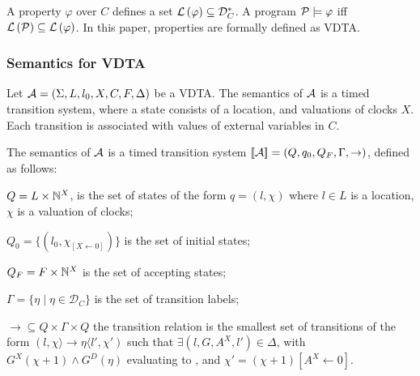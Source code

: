 A property $\varphi$ over $C$ defines a set ${\mathcal L}\left(\varphi\right)\subseteq {\mathcal D}_C^{*}$.
A program ${\mathcal P} \models \varphi$ iff ${\mathcal L}\left({\mathcal P}\right) \subseteq  {\mathcal L}\left(\varphi\right)$.
In this paper, properties are formally defined as VDTA.


\subsubsection{Semantics for \ac{VDTA}}

Let ${\mathcal A} = \left(\Sigma, L, {l_0}, X, C, F,  \Delta \right)$  be a VDTA.
The semantics of ${\mathcal A}$ is a timed transition system,
where a state consists of a location, and valuations of clocks $X$.
Each transition is associated with values of external variables in $C$.

\begin{definition}
	\label{def:vdta:semantics}
	The semantics of ${\mathcal A}$ is a timed transition system $[\!\left[{\mathcal A}\right]\!]=\left( Q, q_0, Q_F, \Gamma, \to \right)$, defined as follows:
	\squishlist
	\item $Q = L \times \mathbb{N}^X$, is the set of states of the form $q= \left( l,\chi \right)$ where
	$l \in L$ is a location,
	$\chi$ is a valuation of clocks;
	\item $Q_0 = \{ \left( l_0, \chi_{\left[X \leftarrow 0\right]} \right) \}$ is the set of initial states;
	\item $Q_F = F \times  \mathbb{N}^X$ is the set of accepting states;
	\item $\Gamma = \{ \eta \mid
	\eta \in {\mathcal D}_{C}  \}$ is the set of transition labels;
	\item $\to\subseteq Q\times \Gamma\times Q$  the transition relation
	is the smallest set of transitions of the form
	$\left( l,\chi \rangle \longrightarrow {\eta} \langle l',\chi'\right)$
	such that  $\exists \left( l, G, A^X, l' \right) \in \Delta$,
	with $G^X\left(\chi + 1\right) \wedge G^D\left(\eta\right) $ evaluating to {\true},
	and $\chi'=\left(\chi+1\right)[A^X \leftarrow 0]$.
	\squishend
\end{definition}

